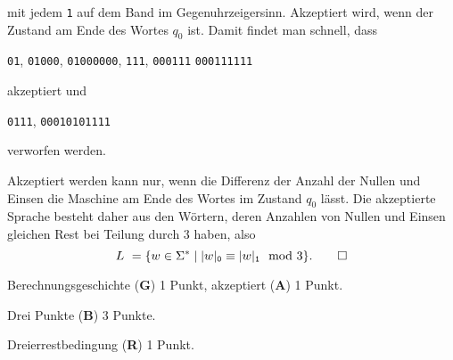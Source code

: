 \begin{loesung}
\begin{teilaufgaben}
mit jedem \texttt{1} auf dem Band im Gegenuhrzeigersinn.
Akzeptiert wird, wenn der Zustand am Ende des Wortes $q_0$ ist.
Damit findet man schnell, dass
\begin{center}
\texttt{01},
\texttt{01000},
\texttt{01000000},
\texttt{111},
\texttt{000111}
\texttt{000111111}
\end{center}
akzeptiert und
\begin{center}
\texttt{0111},
\texttt{00010101111}
\end{center}
verworfen werden.
\item
Akzeptiert werden kann nur, wenn die Differenz der Anzahl der Nullen und
Einsen die Maschine am Ende des Wortes im Zustand $q_0$ lässt.
Die akzeptierte Sprache besteht daher aus den Wörtern, deren Anzahlen
von Nullen und Einsen gleichen Rest bei Teilung durch 3 haben,
also
\[
L = \{
w\in\Sigma^*
\;|\;
|w|_{\texttt{0}} \equiv |w|_{\texttt{1}} \mod 3
\}.
\qedhere
\]
\end{teilaufgaben}
\end{loesung}

\begin{bewertung}
\begin{teilaufgaben}
\item 
Berechnungsgeschichte ({\bf G}) 1 Punkt,
akzeptiert ({\bf A}) 1 Punkt.
\item
Drei Punkte ({\bf B}) 3 Punkte.
\item
Dreierrestbedingung ({\bf R}) 1 Punkt.
\end{teilaufgaben}
\end{bewertung}
